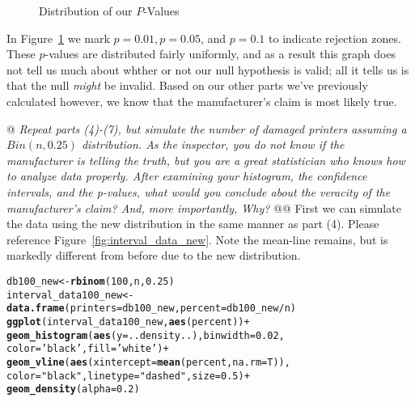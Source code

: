\documentclass[10pt]{report}\usepackage[]{graphicx}\usepackage[]{xcolor}
\makeatletter
\newcommand{\hlnum}[1]{\textcolor[rgb]{0.686,0.059,0.569}{#1}}%
\newcommand{\hlstr}[1]{\textcolor[rgb]{0.192,0.494,0.8}{#1}}%
\newcommand{\hlopt}[1]{\textcolor[rgb]{0,0,0}{#1}}%
\newcommand{\hlstd}[1]{\textcolor[rgb]{0.345,0.345,0.345}{#1}}%
\newcommand{\hlkwb}[1]{\textcolor[rgb]{0.69,0.353,0.396}{#1}}%
\newcommand{\hlkwc}[1]{\textcolor[rgb]{0.333,0.667,0.333}{#1}}%
\newcommand{\hlkwd}[1]{\textcolor[rgb]{0.737,0.353,0.396}{\textbf{#1}}}%
\newenvironment{kframe}{%
 \def\at@end@of@kframe{}%
 \ifinner\ifhmode%
  \def\at@end@of@kframe{\end{minipage}}%
  \begin{minipage}{\columnwidth}%
 \fi\fi%
 \def\FrameCommand##1{\hskip\@totalleftmargin \hskip-\fboxsep
 \colorbox{shadecolor}{##1}\hskip-\fboxsep
     \hskip-\linewidth \hskip-\@totalleftmargin \hskip\columnwidth}%
 \MakeFramed {\advance\hsize-\width
   \@totalleftmargin\z@ \linewidth\hsize
   \@setminipage}}%
 {\par\unskip\endMakeFramed%
 \at@end@of@kframe}
\newenvironment{knitrout}{}{} %
\makeatother
\begin{document}
\begin{easylist}[enumerate]
\begin{knitrout}
\begin{figure}[H]
{}

\caption[Distribution of our $P$-Values]{Distribution of our $P$-Values\label{fig:pvalues}}
\end{figure}


\end{knitrout}


        In Figure~\ref{fig:pvalues} we mark $p=0.01, p=0.05$, and $p=0.1$ to indicate rejection zones. These $p$-values
        are distributed fairly uniformly, and as a result this graph does not tell us much about whther or not our null
        hypothesis is valid; all it tells us is that the null \textit{might} be invalid. Based on our other parts we've
        previously calculated however, we know that the manufacturer's claim is most likely true.

        \newpage
        @ \textit{Repeat parts (4)-(7), but simulate the number of damaged printers assuming a $Bin(n, 0.25)$
        distribution. As the inspector, you do not know if the manufacturer is telling the truth, but you are a great
        statistician who knows how to analyze data properly. After examining your histogram, the confidence intervals, and
        the p-values, what would you conclude about the veracity of the manufacturer's claim? And, more importantly,
        Why?}\newline
        @@ First we can simulate the data using the new distribution in the same manner as part (4). Please reference
        Figure~\ref{fig:interval_data_new}. Note the mean-line remains, but is markedly different from before due to the
        new distribution.

\begin{knitrout}
\color{fgcolor}\begin{kframe}
\begin{alltt}
         \hlstd{db100_new} \hlkwb{<-} \hlkwd{rbinom}\hlstd{(}\hlnum{100}\hlstd{, n,} \hlnum{0.25}\hlstd{)}
         \hlstd{interval_data100_new} \hlkwb{<-} \hlkwd{data.frame}\hlstd{(}\hlkwc{printers}\hlstd{=db100_new,} \hlkwc{percent}\hlstd{=db100_new}\hlopt{/}\hlstd{n)}
         \hlkwd{ggplot}\hlstd{(interval_data100_new,} \hlkwd{aes}\hlstd{(percent))} \hlopt{+}
                    \hlkwd{geom_histogram}\hlstd{(}\hlkwd{aes}\hlstd{(}\hlkwc{y}\hlstd{=..density..),} \hlkwc{binwidth}\hlstd{=}\hlnum{0.02}\hlstd{,}
                                   \hlkwc{color}\hlstd{=}\hlstr{'black'}\hlstd{,} \hlkwc{fill}\hlstd{=}\hlstr{'white'}\hlstd{)} \hlopt{+}
                    \hlkwd{geom_vline}\hlstd{(}\hlkwd{aes}\hlstd{(}\hlkwc{xintercept}\hlstd{=}\hlkwd{mean}\hlstd{(percent,} \hlkwc{na.rm}\hlstd{=T)),}
                               \hlkwc{color}\hlstd{=}\hlstr{"black"}\hlstd{,} \hlkwc{linetype}\hlstd{=}\hlstr{"dashed"}\hlstd{,} \hlkwc{size}\hlstd{=}\hlnum{0.5}\hlstd{)} \hlopt{+}
                    \hlkwd{geom_density}\hlstd{(}\hlkwc{alpha}\hlstd{=}\hlnum{0.2}\hlstd{)}
\end{alltt}
\end{kframe}\begin{figure}[H]



\end{figure}
\end{knitrout}
\end{easylist}
\end{document}
